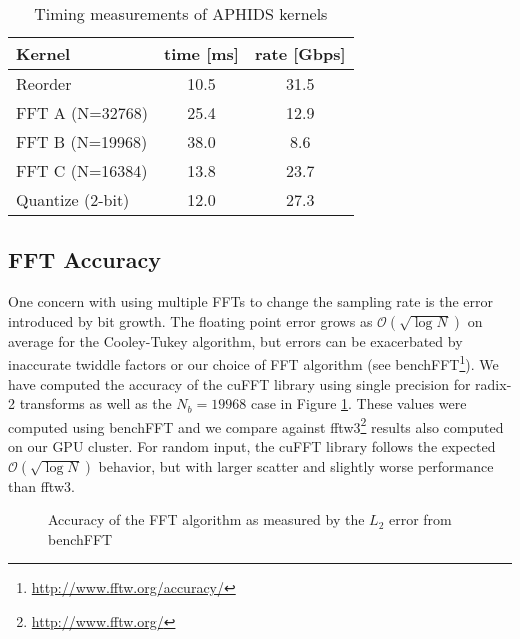 \begin{table}
\begin{center}
\caption{Timing measurements of APHIDS kernels \label{tab:kernel_times}}
\begin{threeparttable}
\begin{tabular}{l|cc}
\toprule
Kernel & time [ms] & rate [Gbps] \\
\midrule
Reorder                & 10.5 & 31.5 \\
FFT A (N=32768)        & 25.4 & 12.9 \\
FFT B (N=19968)        & 38.0 & 8.6  \\
FFT C (N=16384)        & 13.8 & 23.7 \\
Quantize (2-bit)       & 12.0 & 27.3 \\
\bottomrule
\end{tabular}
\end{threeparttable}
\end{center}
\end{table}

\subsection{FFT Accuracy}
One concern with using multiple FFTs to change the sampling rate is the error introduced by bit growth.  The 
floating point error grows as $\mathcal{O}(\sqrt{\log{N}})$ \citep{schatzman96} on average for the Cooley-Tukey
algorithm, but errors can be exacerbated by inaccurate twiddle factors or our choice of FFT algorithm (see
benchFFT\footnote{\url{http://www.fftw.org/accuracy/}}).  We have computed the accuracy of the cuFFT library 
using single precision for 
radix-2 transforms as well as the $N_b = 19968$ case in Figure \ref{fig:fft_accuracy}.  These values 
were computed using benchFFT and we compare against fftw3\footnote{\url{http://www.fftw.org/}}
results also computed on our GPU cluster.  For random input, the cuFFT library follows the expected 
$\mathcal{O}(\sqrt{\log{N}})$ behavior, but with larger scatter and slightly worse performance than fftw3.

\begin{figure}[t]
\caption{Accuracy of the FFT algorithm as measured by the $L_2$ error from benchFFT} \label{fig:fft_accuracy}
\end{figure}

